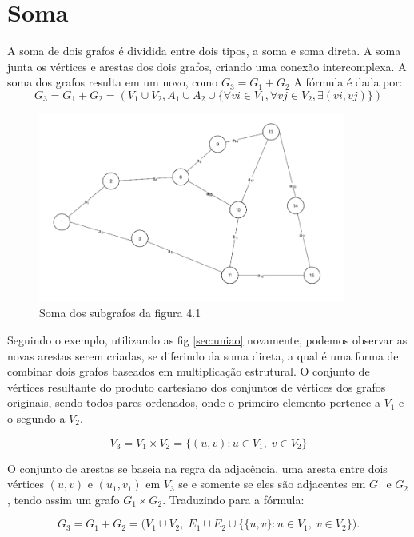 	\section{Soma}\label{sec:soma}
	A soma de dois grafos é dividida entre dois tipos, a soma e soma direta.
	A soma junta os vértices e arestas dos dois grafos, criando uma conexão intercomplexa. A soma dos grafos resulta em um novo, como $G_3 = G_1 + G_2$ A fórmula é dada por:
	\[
	G_3 = G_1 + G_2 = (V_1 \cup V_2, A_1 \cup A_2 \cup \{ \forall vi \in V_1, \forall vj \in V_2, \exists(vi, vj) \})
	\]
	
	\begin{figure}[!h]
		\centering
		\includegraphics[width=0.9\textwidth]{figuras/subgrafos/subgrafo_soma.png}
		\caption{Soma dos subgrafos da figura 4.1}
		\label{fig:somaGrafos}
	\end{figure}
	
	Seguindo o exemplo, utilizando as fig \ref{sec:uniao} novamente, podemos observar as novas arestas serem criadas, se diferindo da soma direta, a qual é uma forma de combinar dois grafos baseados em multiplicação estrutural. O conjunto de vértices resultante do produto cartesiano dos conjuntos de vértices dos grafos originais, sendo todos pares ordenados, onde o primeiro elemento pertence a $V_1$ e o segundo a $V_2$.
	
	\[
	V_3 = V_1 \times V_2 = \{(u,v):u\in V_1,\; v\in V_2\}
	\]
	
	O conjunto de arestas se baseia na regra da adjacência, uma aresta entre dois vértices $(u, v)$ e $(u_1, v_1)$ em $V_3$ se e somente se eles são adjacentes em $G_1$ e $G_2$, tendo assim um grafo  $G_1 \times G_2$. Traduzindo para a fórmula:
	
	\[ %
	G_3 = G_1+G_2=\big(V_1\cup V_2,\;E_1\cup E_2\cup \{\{u,v\}:u\in V_1,\; v\in V_2\}\big).
	\]
	
